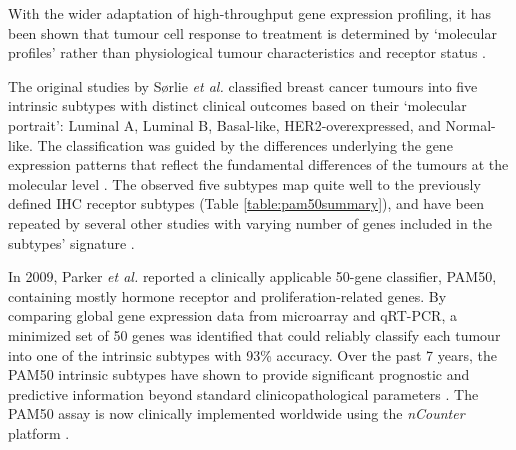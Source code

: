 With the wider adaptation of high-throughput gene expression profiling, it has been shown that tumour cell response to treatment is determined by ‘molecular profiles’ rather than physiological tumour characteristics and receptor status \cite{Weigelt2010}. 

The original studies by Sørlie \textit{et al.} \cite{Srlie2001GeneImplications} classified breast cancer tumours into five intrinsic subtypes with distinct clinical outcomes based on their ‘molecular portrait’: Luminal A, Luminal B, Basal-like, HER2-overexpressed, and Normal-like. The classification was guided by the differences underlying the gene expression patterns that reflect the fundamental differences of the tumours at the molecular level \cite{Srlie2003RepeatedSets}. The observed five subtypes map quite well to the previously defined IHC receptor subtypes (Table  \ref{table:pam50summary}), and have been repeated by several other studies with varying number of genes included in the subtypes’ signature \cite{Dai2015}. 

In 2009, Parker \textit{et al. }\cite{ParkerSupervisedSubtypes} reported a clinically applicable 50-gene classifier, PAM50, containing mostly hormone receptor and proliferation-related genes. By comparing global gene expression data from microarray and qRT-PCR, a minimized set of 50 genes was identified that could reliably classify each tumour into one of the intrinsic subtypes with 93\% accuracy. Over the past 7 years, the PAM50 intrinsic subtypes have shown to provide significant prognostic and predictive information beyond standard clinicopathological parameters \cite{Vidal2017} \cite{GnantPredictingAlone}. The PAM50 assay is now clinically implemented worldwide using the \textit{nCounter} platform \cite{Vidal2017}.

